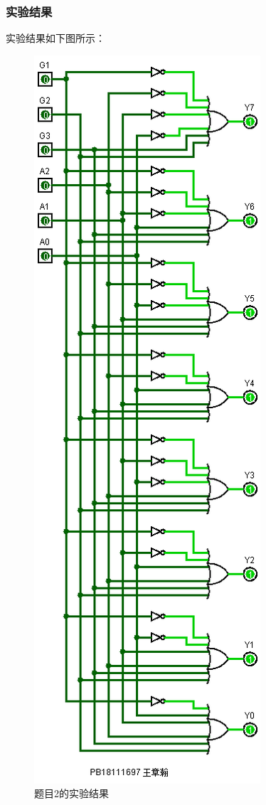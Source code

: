 \documentclass[UTF8]{article}
\begin{document}
	\subsubsection{实验结果}
	实验结果如下图所示：\par
	\begin{figure}[H]
		\centering
		\includegraphics[scale=0.5]{Problem2.png}
		\caption{题目2的实验结果}
		\label{Problem2}
	\end{figure}\par
\end{document}
